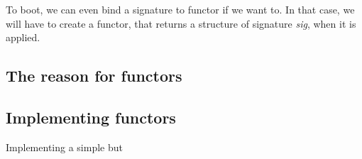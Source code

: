 To boot, we can even bind a signature to functor if we want to. In that case, we
will have to create a functor, that returns a structure of signature
\textit{sig}, when it is applied.

\subsection{The reason for functors}
\label{subsec:reasonfunctors}






\subsection{Implementing functors}
\label{subsec:implementing_functors}
Implementing a simple but 




